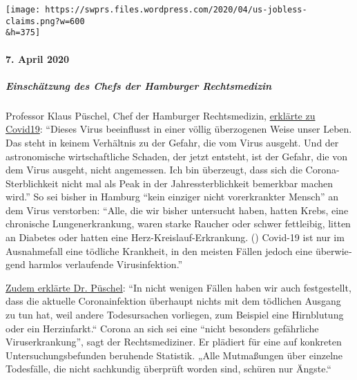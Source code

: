 \texttt{[image: https://swprs.files.wordpress.com/2020/04/us-jobless-claims.png?w=600\\\&h=375]}

\hypertarget{7-april-2020}{%
\paragraph{7. April 2020}\label{7-april-2020}}

\hypertarget{einschuxe4tzung-des-chefs-der-hamburger-rechtsmedizin}{%
\subparagraph{\texorpdfstring{\textbf{Einschätzung des Chefs der
Hamburger
Rechtsmedizin}}{Einschätzung des Chefs der Hamburger Rechtsmedizin}}\label{einschuxe4tzung-des-chefs-der-hamburger-rechtsmedizin}}

Professor Klaus Püschel, Chef der Hamburger Rechtsmedizin,
\href{https://www.pressreader.com/germany/hamburger-morgenpost/20200403/281487868456736}{erklärte
zu Covid19}: ``Die­ses Vi­rus be­ein­flusst in ei­ner völ­lig
über­zo­ge­nen Wei­se un­ser Le­ben. Das steht in kei­nem Ver­hält­nis
zu der Ge­fahr, die vom Vi­rus aus­geht. Und der as­tro­no­mi­sche
wirt­schaft­li­che Scha­den, der jetzt ent­steht, ist der Ge­fahr, die
von dem Vi­rus aus­geht, nicht an­ge­mes­sen. Ich bin über­zeugt, dass
sich die Co­ro­na-Sterb­lich­keit nicht mal als Peak in der
Jah­res­s­terb­lich­keit be­merk­bar ma­chen wird.'' So sei bis­her in
Ham­burg ``kein ein­zi­ger nicht vor­er­krank­ter Mensch'' an dem Vi­rus
ver­stor­ben: ``Al­le, die wir bis­her un­ter­sucht ha­ben, hat­ten
Krebs, ei­ne chro­ni­sche Lun­gen­er­kran­kung, wa­ren star­ke Rau­cher
oder schwer fett­lei­big, lit­ten an Dia­be­tes oder hat­ten ei­ne
Her­z-K­reis­lauf-Er­kran­kung. () Co­vid-19 ist nur im Aus­nah­me­fall
ei­ne töd­li­che Krank­heit, in den meis­ten Fäl­len je­doch ei­ne
über­wie­gend harm­los ver­lau­fen­de Vi­rus­in­fek­ti­on.''

\href{https://www.abendblatt.de/hamburg/article228828787/rechtsmedizin-pueschel-hamburg-corona-virus-infektion-covid-19-coronavirus-krise-patienten-krankenhaeuser-kliniken-infektionsrate-krankheit-pandemie-test-lungenkrankheit-sars-cov-epidemie-sars-cov-2.html}{Zudem
erklärte Dr. Püschel}: ``In nicht wenigen Fällen haben wir auch
festgestellt, dass die aktuelle Coronainfektion überhaupt nichts mit dem
tödlichen Ausgang zu tun hat, weil andere Todesursachen vorliegen, zum
Beispiel eine Hirnblutung oder ein Herzinfarkt.`` Corona an sich sei
eine ``nicht besonders gefährliche Viruserkrankung'', sagt der
Rechtsmediziner. Er plädiert für eine auf konkreten
Unter­suchungs­befunden beruhende Statistik. „Alle Mutmaßungen über
einzelne Todesfälle, die nicht sachkundig überprüft worden sind, schüren
nur Ängste.``

